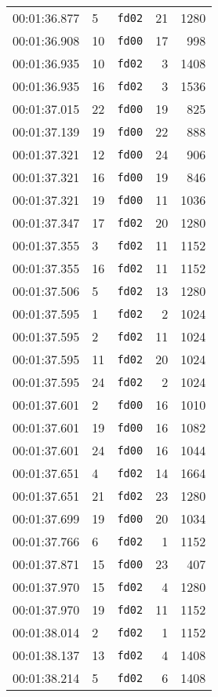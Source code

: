 \documentclass{article}
\begin{document}
\begin{longtable}{lllrr}
00:01:36.877 & 5 & \texttt{fd02} & 21 & 1280 \\
00:01:36.908 & 10 & \texttt{fd00} & 17 & 998 \\
00:01:36.935 & 10 & \texttt{fd02} & 3 & 1408 \\
00:01:36.935 & 16 & \texttt{fd02} & 3 & 1536 \\
00:01:37.015 & 22 & \texttt{fd00} & 19 & 825 \\
00:01:37.139 & 19 & \texttt{fd00} & 22 & 888 \\
00:01:37.321 & 12 & \texttt{fd00} & 24 & 906 \\
00:01:37.321 & 16 & \texttt{fd00} & 19 & 846 \\
00:01:37.321 & 19 & \texttt{fd00} & 11 & 1036 \\
00:01:37.347 & 17 & \texttt{fd02} & 20 & 1280 \\
00:01:37.355 & 3 & \texttt{fd02} & 11 & 1152 \\
00:01:37.355 & 16 & \texttt{fd02} & 11 & 1152 \\
00:01:37.506 & 5 & \texttt{fd02} & 13 & 1280 \\
00:01:37.595 & 1 & \texttt{fd02} & 2 & 1024 \\
00:01:37.595 & 2 & \texttt{fd02} & 11 & 1024 \\
00:01:37.595 & 11 & \texttt{fd02} & 20 & 1024 \\
00:01:37.595 & 24 & \texttt{fd02} & 2 & 1024 \\
00:01:37.601 & 2 & \texttt{fd00} & 16 & 1010 \\
00:01:37.601 & 19 & \texttt{fd00} & 16 & 1082 \\
00:01:37.601 & 24 & \texttt{fd00} & 16 & 1044 \\
00:01:37.651 & 4 & \texttt{fd02} & 14 & 1664 \\
00:01:37.651 & 21 & \texttt{fd02} & 23 & 1280 \\
00:01:37.699 & 19 & \texttt{fd00} & 20 & 1034 \\
00:01:37.766 & 6 & \texttt{fd02} & 1 & 1152 \\
00:01:37.871 & 15 & \texttt{fd00} & 23 & 407 \\
00:01:37.970 & 15 & \texttt{fd02} & 4 & 1280 \\
00:01:37.970 & 19 & \texttt{fd02} & 11 & 1152 \\
00:01:38.014 & 2 & \texttt{fd02} & 1 & 1152 \\
00:01:38.137 & 13 & \texttt{fd02} & 4 & 1408 \\
00:01:38.214 & 5 & \texttt{fd02} & 6 & 1408 \\

\end{longtable}
\end{document}
